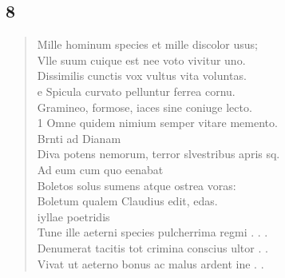 \documentclass[11pt, a4paper]{report}
\begin{document}
            \subsection*{8}
      \begin{verse}
      Mille hominum species et mille discolor usus; \\ Vlle suum cuique est nee voto vivitur uno. \\ Dissimilis cunctis vox vultus vita voluntas. \\ e Spicula curvato pelluntur ferrea cornu. \\ Gramineo, formose, iaces sine coniuge lecto. \\ 1 Omne quidem nimium semper vitare memento. \\ Brnti ad Dianam \\ Diva potens nemorum, terror slvestribus apris sq. \\ Ad eum cum quo eenabat \\ Boletos solus sumens atque ostrea voras: \\ Boletum qualem Claudius edit, edas. \\ iyllae poetridis \\ Tune ille aeterni species pulcherrima regmi . . . \\ Denumerat tacitis tot crimina conscius ultor . . \\ Vivat ut aeterno bonus ac malus ardent ine . . \\ 
      \end{verse}
  
        
\end{document}
